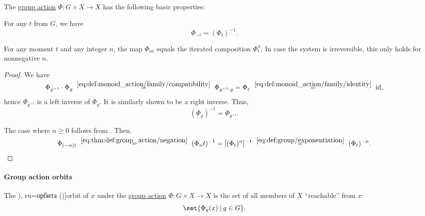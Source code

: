 \begin{proposition}\label{thm:def:group_action}
  The \hyperref[def:group_action]{group action} \( \Phi: G \times X \to X \) has the following basic properties:
  \begin{thmenum}
     For any \( t \) from \( G \), we have
    \begin{equation}\label{eq:thm:def:group_action/negation}
      \Phi_{-t} = (\Phi_t)^{-1}.
    \end{equation}

     For any moment \( t \) and any integer \( n \), the map \( \Phi_{nt} \) equals the iterated composition \( \Phi_t^n \). In case the system is irreversible, this only holds for nonnegative \( n \).
  \end{thmenum}
\end{proposition}
\begin{proof}
   We have
  \begin{equation*}
    \Phi_{g^{-1}} \cdot \Phi_g
    \reloset {\eqref{eq:def:monoid_action/family/compatibility}} =
    \Phi_{g^{-1} \cdot g}
    =
    \Phi_e
    \reloset {\eqref{eq:def:monoid_action/family/identity}} =
    \id,
  \end{equation*}
  hence \( \Phi_{g^{-1}} \) is a left inverse of \( \Phi_g \). It is similarly shown to be a right inverse. Thus,
  \begin{equation*}
    (\Phi_g)^{-1} = \Phi_{g^{-1}}.
  \end{equation*}

   The case where \( n \geq 0 \) follows from . Then,
  \begin{equation*}
    \Phi_{(-n)t}
    \reloset {\eqref{eq:thm:def:group_action/negation}} =
    (\Phi_nt)^{-1}
    =
    [(\Phi_t)^n]^{-1}
    \reloset {\eqref{eq:def:group/exponentiation}} =
    (\Phi_t)^{-n}.
  \end{equation*}
\end{proof}

\paragraph{Group action orbits}

\begin{definition}\label{def:group_action_orbit}
  The \term[bg=орбита (\cite[def. IV.20]{ГеновМиховскиМоллов1991Алгебра}), ru=орбита (\cite[453]{Винберг2014КурсАлгебры})]{orbit} of \( x \) under the \hyperref[def:group_action]{group action} \( \Phi: G \times X \to X \) is the set of all members of \( X \) \enquote{reachable} from \( x \):
  \begin{equation*}
    \set{ \Phi_g(x) \given g \in G }.
  \end{equation*}
\end{definition}

